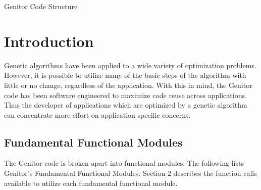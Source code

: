 
\setlength{\textwidth}{7.25in}
\setlength{\textheight}{9.25in}
\setlength{\oddsidemargin}{-.2in}
\setlength{\evensidemargin}{-.2in}
\setlength{\topmargin}{-.5in}



\begin{center}
{\huge Genitor Code Structure}
\end{center}

\section{Introduction}

Genetic algorithms have been applied to a wide variety of optimization
problems.  However, it is possible to utilize many of the basic steps
of the algorithm with little or no change, regardless of the application.
With this in mind, the Genitor code has been software engineered to 
maximize code reuse across applications.  Thus the developer of applications
which are optimized by a genetic algorithm can concentrate more effort on
application specific concerns.

\subsection{Fundamental Functional Modules}

The Genitor code is broken apart into functional modules. The following
lists Genitor's Fundamental Functional Modules. Section 2 describes
the function calls available to utilize each fundamental functional
module.

